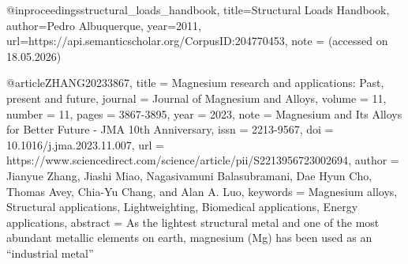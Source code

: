 @inproceedings{structural_loads_handbook,
  title={Structural Loads Handbook},
  author={Pedro Albuquerque},
  year={2011},
  url={https://api.semanticscholar.org/CorpusID:204770453},
  note = {(accessed on 18.05.2026)}
}

@article{ZHANG20233867,
title = {Magnesium research and applications: Past, present and future},
journal = {Journal of Magnesium and Alloys},
volume = {11},
number = {11},
pages = {3867-3895},
year = {2023},
note = {Magnesium and Its Alloys for Better Future - JMA 10th Anniversary},
issn = {2213-9567},
doi = {10.1016/j.jma.2023.11.007},
url = {https://www.sciencedirect.com/science/article/pii/S2213956723002694},
author = {Jianyue Zhang, Jiashi Miao, Nagasivamuni Balasubramani, Dae Hyun Cho, Thomas Avey, Chia-Yu Chang, and Alan A. Luo},
keywords = {Magnesium alloys, Structural applications, Lightweighting, Biomedical applications, Energy applications},
abstract = {As the lightest structural metal and one of the most abundant metallic elements on earth, magnesium (Mg) has been used as an “industrial metal”}
}